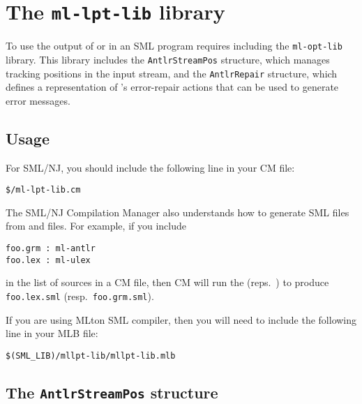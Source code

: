 %
\chapter{The {\tt ml-lpt-lib} library}
\label{ch:ml-lpt-lib}

To use the output of \ulex{} or \mlantlr{} in an SML program requires including the
\texttt{ml-opt-lib} library.
This library includes the \texttt{AntlrStreamPos} structure, which manages tracking
positions in the input stream, and the \texttt{AntlrRepair} structure, which defines
a representation of \mlantlr{}'s error-repair actions that can be used to generate
error messages.

\section{Usage}
For SML/NJ, you should include the following line in your CM file:
\begin{lstlisting}[language=CM]
$/ml-lpt-lib.cm
\end{lstlisting}%
The SML/NJ Compilation Manager also understands how to generate SML files from \ulex{} and
\mlantlr{} files.
For example, if you include
\begin{lstlisting}
foo.grm : ml-antlr
foo.lex : ml-ulex
\end{lstlisting}%
in the list of sources in a CM file, then CM will run the \ulex{} (reps.\ \mlantlr{})
to produce \texttt{foo.lex.sml} (resp.\ \texttt{foo.grm.sml}).

If you are using MLton SML compiler, then you will need to include the following line
in your MLB file:
\begin{lstlisting}
$(SML_LIB)/mllpt-lib/mllpt-lib.mlb
\end{lstlisting}%

\section{The {\tt AntlrStreamPos} structure}

